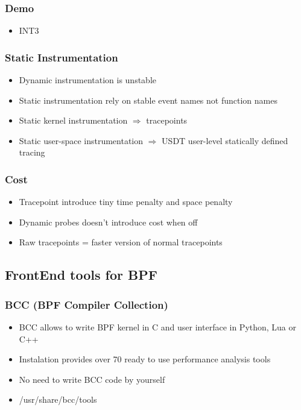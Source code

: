 \documentclass{beamer}
\begin{document}
\begin{frame}
	\frametitle{Demo}
	\begin{Huge}
  \begin{itemize}
    \item<1-> INT3
	\end{itemize}	
\end{Huge}
\end{frame}

\begin{frame}
  \frametitle{Static Instrumentation}
	\begin{Large}
	\begin{itemize}
		\item<+-> Dynamic instrumentation is unstable
		\item<+-> Static instrumentation rely on stable event names not function names
		\item<+-> Static kernel instrumentation $\Rightarrow$ tracepoints
		\item<+-> Static user-space instrumentation $\Rightarrow$ USDT user-level statically defined tracing
	\end{itemize}
	\end{Large}
\end{frame}

\begin{frame}
  \frametitle{Cost}
	\begin{Large}
		\begin{itemize}
			\item<+-> Tracepoint introduce tiny time penalty and space penalty
			\item<+-> Dynamic probes doesn't introduce cost when off
			\item<+-> Raw tracepoints = faster version of normal tracepoints
		\end{itemize}
	\end{Large}
\end{frame}


\subsection{FrontEnd tools for BPF}
\begin{frame}
  \frametitle{BCC (BPF Compiler Collection)}
	\begin{Large}
  \begin{itemize}
    \item<+-> BCC allows to write BPF kernel in C and user interface in Python, Lua or C++
    \item<+-> Instalation provides over 70 ready to use performance analysis tools
    \item<+-> No need to write BCC code by yourself
    \item<+-> /usr/share/bcc/tools
  \end{itemize}
\end{Large}
\end{frame}
\end{document}
